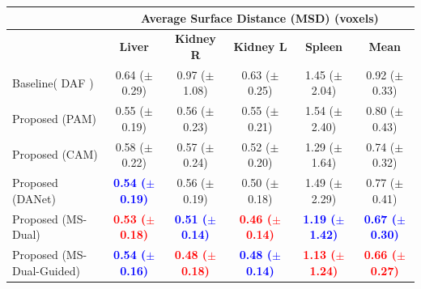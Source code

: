\documentclass[journal]{IEEEtran}
\begin{document}
\begin{table}[ht!]
\begin{tabular}{lcccc|c}
\midrule
& \multicolumn{5}{c}{\textbf{Average Surface Distance (MSD)} (voxels)}\\
 \midrule
 & \textbf{Liver} & \textbf{Kidney R} & \textbf{Kidney L} & \textbf{Spleen} & \textbf{Mean}  \\
 \midrule
Baseline( DAF \cite{wang18d})  & 0.64 ($\pm$0.29) & 0.97 ($\pm$1.08) & 0.63 ($\pm$0.25)& 1.45 ($\pm$2.04)&  0.92 ($\pm$0.33)  \\
Proposed (PAM)     & 0.55 ($\pm$0.19)& 0.56 ($\pm$0.23)& 0.55 ($\pm$0.21)& 1.54 ($\pm$2.40)&  0.80 ($\pm$0.43) \\
Proposed (CAM)     &  0.58 ($\pm$0.22)& 0.57 ($\pm$0.24)& 0.52 ($\pm$0.20)& 1.29 ($\pm$1.64)  & 0.74 ($\pm$0.32)\\
Proposed (DANet) & \textcolor{blue}{\textbf{0.54 ($\pm$0.19)}}  &0.56 ($\pm$0.19) & 0.50 ($\pm$0.18)& 1.49 ($\pm$2.29)&   0.77 ($\pm$0.41) \\
Proposed (MS-Dual)  & \textcolor{red}{\textbf{0.53 ($\pm$0.18)}}  & \textcolor{blue}{\textbf{0.51 ($\pm$0.14)}}&  \textcolor{red}{\textbf{0.46 ($\pm$0.14)}} & \textcolor{blue}{\textbf{1.19 ($\pm$1.42)}} &  \textcolor{blue}{\textbf{0.67 ($\pm$0.30)}}\\
Proposed (MS-Dual-Guided)  & \textcolor{blue}{\textbf{0.54 ($\pm$0.16)}}  & \textcolor{red}{\textbf{0.48 ($\pm$0.18)}}&  \textcolor{blue}{\textbf{0.48 ($\pm$0.14)}} & \textcolor{red}{\textbf{1.13 ($\pm$1.24)}} &  \textcolor{red}{\textbf{0.66 ($\pm$0.27)}}\\
\midrule



\end{tabular}
\end{table}
\end{document}
